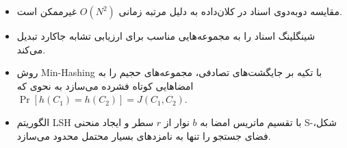 \begin{summarybox}
\begin{itemize}
    \item مقایسه دوبه‌دوی اسناد در کلان‌داده به دلیل مرتبه زمانی $O(N^2)$ غیرممکن است.
    \item شینگلینگ اسناد را به مجموعه‌هایی مناسب برای ارزیابی تشابه جاکارد تبدیل می‌کند.
    \item روش Min-Hashing با تکیه بر جایگشت‌های تصادفی، مجموعه‌های حجیم را به امضاهایی کوتاه فشرده می‌سازد به نحوی که $\Pr[h(C_1) = h(C_2)] = J(C_1, C_2)$.
    \item الگوریتم LSH با تقسیم ماتریس امضا به $b$ نوار از $r$ سطر و ایجاد منحنی S-شکل، فضای جستجو را تنها به نامزدهای بسیار محتمل محدود می‌سازد.
\end{itemize}
\end{summarybox}

